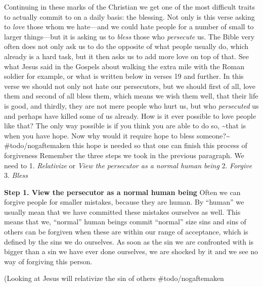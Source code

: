 Continuing in these marks of the Christian we get one of the most
difficult traits to actually commit to on a daily basis: the blessing.
Not only is this verse asking to \emph{love} those whom we hate---and we
could hate people for a number of small to larger things---but it is
asking us to \emph{bless} those who \emph{persecute} us. The Bible very
often does not only ask us to do the opposite of what people usually do,
which already is a hard task, but it then asks us to add more love on
top of that. See what Jesus said in the Gospels about walking the extra
mile with the Roman soldier for example, or what is written below in
verses 19 and further. In this verse we should not only not hate our
persecutors, but we should first of all, love them and second of all
bless them, which means we wish them well, that their life is good, and
thirdly, they are not mere people who hurt us, but who \emph{persecuted}
us and perhaps have killed some of us already. How is it ever possible
to love people like that? The only way possible is if you think you are
able to do so, \textasciitilde that is when you have hope. Now why would
it require hope to bless someone?\textasciitilde{} \#todo/nogaftemaken
this hope is needed so that one can finish this process of forgiveness
Remember the three steps we took in the previous paragraph. We need to
1. \emph{Relativize} or \emph{View the persecutor as a normal human
being} 2. \emph{Forgive} 3. \emph{Bless}

\textbf{Step 1. View the persecutor as a normal human being} Often we
can forgive people for smaller mistakes, because they are human. By
``human'' we usually mean that we have committed these mistakes
ourselves as well. This means that we, ``normal'' human beings commit
``normal'' size sins and sins of others can be forgiven when these are
within our range of acceptance, which is defined by the sins we do
ourselves. As soon as the sin we are confronted with is bigger than a
sin we have ever done ourselves, we are shocked by it and we see no way
of forgiving this person.

(Looking at Jesus will relativize the sin of others \#todo/nogaftemaken

